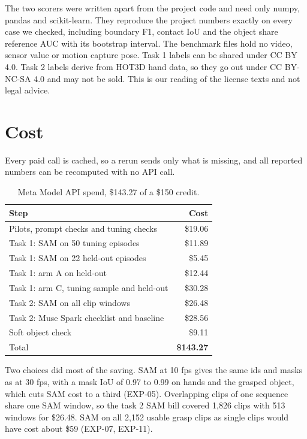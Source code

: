 \documentclass[10pt,twocolumn,letterpaper]{article}
\begin{document}
The two scorers were written apart from the project code and need only numpy,
pandas and scikit-learn. They reproduce the project numbers exactly on every
case we checked, including boundary F1, contact IoU and the object share
reference AUC with its bootstrap interval. The benchmark files hold no video,
sensor value or motion capture pose. Task 1 labels can be shared under CC BY 4.0.
Task 2 labels derive from HOT3D hand data, so they go out under
CC BY-NC-SA 4.0 and may not be sold. This is our reading of the license texts
and not legal advice.

\section{Cost}

Every paid call is cached, so a rerun sends only what is missing, and all
reported numbers can be recomputed with no API call.

\begin{table}[t]
\centering
\caption{Meta Model API spend, \$143.27 of a \$150 credit.}
\label{tab:cost}
\small
\begin{tabular}{lr}
\toprule
Step & Cost \\
\midrule
Pilots, prompt checks and tuning checks & \$19.06 \\
Task 1: SAM on 50 tuning episodes & \$11.89 \\
Task 1: SAM on 22 held-out episodes & \$5.45 \\
Task 1: arm A on held-out & \$12.44 \\
Task 1: arm C, tuning sample and held-out & \$30.28 \\
Task 2: SAM on all clip windows & \$26.48 \\
Task 2: Muse Spark checklist and baseline & \$28.56 \\
Soft object check & \$9.11 \\
\midrule
Total & \textbf{\$143.27} \\
\bottomrule
\end{tabular}
\end{table}

Two choices did most of the saving. SAM at 10 fps gives the same ids and masks
as at 30 fps, with a mask IoU of 0.97 to 0.99 on hands and the grasped object,
which cuts SAM cost to a third (EXP-05). Overlapping clips of one sequence
share one SAM window, so the task 2 SAM bill covered 1,826 clips with 513
windows for \$26.48. SAM on all 2,152 usable grasp clips as single clips would
have cost about \$59 (EXP-07, EXP-11).
\end{document}
